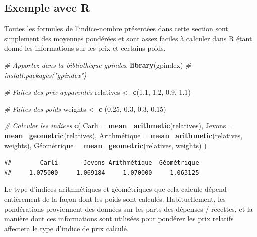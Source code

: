 \documentclass[]{article}
\newenvironment{Shaded}{\begin{snugshade}}{\end{snugshade}}
\newcommand{\CommentTok}[1]{\textcolor[rgb]{0.56,0.35,0.01}{\textit{#1}}}
\newcommand{\DataTypeTok}[1]{\textcolor[rgb]{0.13,0.29,0.53}{#1}}
\newcommand{\FloatTok}[1]{\textcolor[rgb]{0.00,0.00,0.81}{#1}}
\newcommand{\KeywordTok}[1]{\textcolor[rgb]{0.13,0.29,0.53}{\textbf{#1}}}
\newcommand{\NormalTok}[1]{#1}
\newcommand{\StringTok}[1]{\textcolor[rgb]{0.31,0.60,0.02}{#1}}
\begin{document}
\hypertarget{exemple-avec-r}{%
\subsection{Exemple avec R}\label{exemple-avec-r}}

Toutes les formules de l'indice-nombre présentées dans cette section sont simplement des moyennes pondérées et sont assez faciles à calculer dans R étant donné les informations sur les prix et certains poids.

\begin{Shaded}
\begin{Highlighting}[]
\CommentTok{# Apportez dans la bibliothèque gpindex}
\KeywordTok{library}\NormalTok{(gpindex) }\CommentTok{# install.packages("gpindex")}

\CommentTok{# Faites des prix apparentés}
\NormalTok{relatives <-}\StringTok{ }\KeywordTok{c}\NormalTok{(}\FloatTok{1.1}\NormalTok{, }\FloatTok{1.2}\NormalTok{, }\FloatTok{0.9}\NormalTok{, }\FloatTok{1.1}\NormalTok{)}

\CommentTok{# Faites des poids}
\NormalTok{weights <-}\StringTok{ }\KeywordTok{c}\NormalTok{ (}\FloatTok{0.25}\NormalTok{, }\FloatTok{0.3}\NormalTok{, }\FloatTok{0.3}\NormalTok{, }\FloatTok{0.15}\NormalTok{)}

\CommentTok{# Calculer les indices}
\KeywordTok{c}\NormalTok{(}
  \DataTypeTok{Carli =} \KeywordTok{mean_arithmetic}\NormalTok{(relatives),}
  \DataTypeTok{Jevons =} \KeywordTok{mean_geometric}\NormalTok{(relatives),}
\NormalTok{  Arithmé}\DataTypeTok{tique =} \KeywordTok{mean_arithmetic}\NormalTok{(relatives, weights),}
\NormalTok{  Géomé}\DataTypeTok{trique =} \KeywordTok{mean_geometric}\NormalTok{(relatives, weights)}
\NormalTok{)}
\end{Highlighting}
\end{Shaded}

\begin{verbatim}
##        Carli       Jevons Arithmétique  Géométrique 
##     1.075000     1.069184     1.070000     1.063125
\end{verbatim}

Le type d'indices arithmétiques et géométriques que cela calcule dépend entièrement de la façon dont les poids sont calculés. Habituellement, les pondérations proviennent des données sur les parts des dépenses / recettes, et la manière dont ces informations sont utilisées pour pondérer les prix relatifs affectera le type d'indice de prix calculé.
\end{document}
